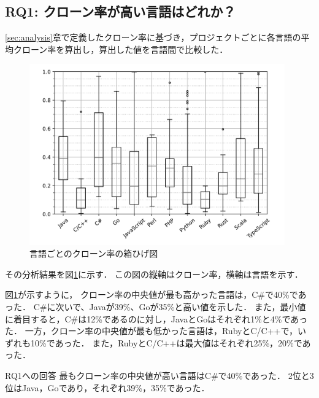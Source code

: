 \documentclass[T,J]{fose}
\begin{document}
\subsection{RQ1: クローン率が高い言語はどれか？}
\ref{sec:analysis}章で定義したクローン率に基づき，プロジェクトごとに各言語の平均クローン率を算出し，算出した値を言語間で比較した．
\begin{figure}[tb]
    \centering
    \includegraphics[width=11.0cm]{images/RQ1.pdf}
    \caption{言語ごとのクローン率の箱ひげ図}
    \label{fig:cloneRateByLanguages}
\end{figure}
%
その分析結果を図\ref{fig:cloneRateByLanguages}に示す．
この図の縦軸はクローン率，横軸は言語を示す．

図\ref{fig:cloneRateByLanguages}が示すように，
クローン率の中央値が最も高かった言語は，C\#で40\%であった．
C\#に次いで、Javaが39\%、Goが35\%と高い値を示した．
また，最小値に着目すると，C\#は12\%であるのに対し，JavaとGoはそれぞれ1\%と4\%であった．
一方，クローン率の中央値が最も低かった言語は，RubyとC/C++で，いずれも10\%であった．
また，RubyとC/C++は最大値はそれぞれ25\%，20\%であった．

\begin{itembox}[l]{RQ1への回答}
最もクローン率の中央値が高い言語はC\#で40\%であった．
2位と3位はJava，Goであり，それぞれ39\%，35\%であった．
\end{itembox}
\end{document}
